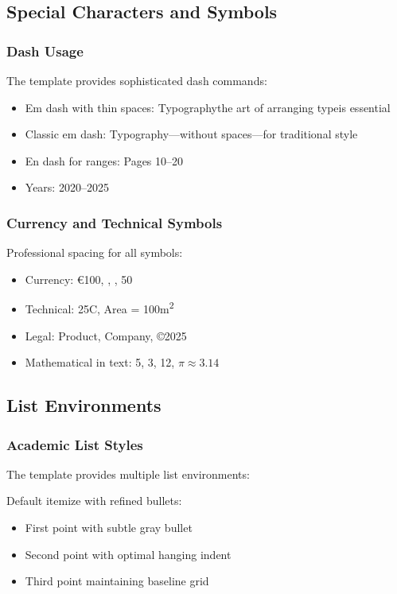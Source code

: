 \subsection{Special Characters and Symbols}

\subsubsection{Dash Usage}

The template provides sophisticated dash commands:

\begin{itemize}
\item Em dash with thin spaces: Typography\emdash the art of arranging type\emdash is essential
\item Classic em dash: Typography---without spaces---for traditional style
\item En dash for ranges: Pages 10--20
\item Years: 2020--2025
\end{itemize}

\subsubsection{Currency and Technical Symbols}

Professional spacing for all symbols:

\begin{itemize}
\item Currency: \euro 100, , , 50\cent
\item Technical: 25\degrees C, Area = 100m\textsuperscript{2}
\item Legal: Product\trademark, Company\registered, \copyright 2025
\item Mathematical in text: 5, 3, 12, $\pi \approx 3.14$
\end{itemize}

\subsection{List Environments}

\subsubsection{Academic List Styles}

The template provides multiple list environments:

 Default itemize with refined bullets:
\begin{itemize}
\item First point with subtle gray bullet
\item Second point with optimal hanging indent
\item Third point maintaining baseline grid
\end{itemize}

